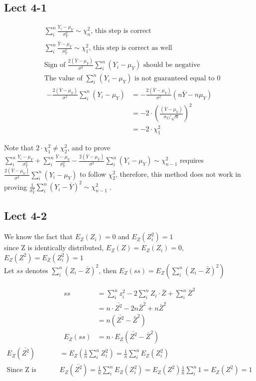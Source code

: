 \documentclass[11pt,letterpaper]{article}
\begin{document}
\subsection*{Lect 4-1}
\begin{align*}
& \sum_i^n \frac{Y_i - \mu_Y}{\sigma_Y^2} \sim \chi_n^2   \text{, this step is correct} \\
& \sum_i^n \frac{\bar{Y} - \mu_Y}{\sigma_Y^2} \sim \chi_1^2  \text{, this step is correct as well} \\
& \text{Sign of }  \frac{2 (\bar{Y} - \mu_Y)}{\sigma^2} \sum_i^n (Y_i - \mu_Y)  \text{ should be negative } \\
& \text{The value of } \sum_i^n (Y_i - \mu_Y)  \text{ is not guaranteed equal to 0}
\end{align*}
\begin{align*}
- \frac{2 (\bar{Y} - \mu_Y)}{\sigma^2} \sum_i^n (Y_i - \mu_Y) &= - \frac{2 (\bar{Y} - \mu_Y)}{\sigma^2} (n \bar{Y} - n \mu_Y) \\
&= -2 \cdot (\frac{(\bar{Y} - \mu_Y)}{\sigma_Y / \sqrt{n}})^2 \\
&= -2 \cdot \chi^2_1
\end{align*}

\noindent Note that $2 \cdot \chi^2_1 \neq \chi^2_2$, and to prove $\sum_i^n \frac{Y_i - \mu_Y}{\sigma_Y^2} + \sum_i^n \frac{\bar{Y} - \mu_Y}{\sigma_Y^2} - \frac{2 (\bar{Y} - \mu_Y)}{\sigma^2} \sum_i^n (Y_i - \mu_Y) \sim \chi^2_{n-1}$ requires $\frac{2 (\bar{Y} - \mu_Y)}{\sigma^2} \sum_i^n (Y_i - \mu_Y)$ to follow $\chi^2_{2}$, therefore, this method does not work in proving $\frac{1}{\sigma^2_Y} \sum_i^n (Y_i - \bar{Y})^2 \sim \chi^2_{n-1}$ .

\subsection*{Lect 4-2}
We know the fact that $E_{Z}(Z_i)=0$ and $E_Z(Z_i^2) = 1$ \\

\noindent since Z is identically distributed, $E_Z(Z) = E_Z(Z_i) = 0$, $E_Z(Z^2) = E_Z(Z_i^2) = 1$\\

Let $ss$ denotes $\sum_i^n (Z_i - \bar{Z})^2$, then $E_Z(ss) = E_Z (\sum_i^n (Z_i - \bar{Z})^2)$

\begin{align*}
ss &= \sum_i^n z_i^2 - 2 \sum_i^n Z_i \cdot \bar{Z} + \sum_i^n \bar{Z} ^2 \\
&= n \cdot \bar{Z^2} - 2 n \bar{Z}^2 + n \bar{Z}^2 \\
&= n ( \bar{Z^2} - \bar{Z}^2 ) \\
E_Z(ss) &= n\cdot E_Z(\bar{Z^2} - \bar{Z}^2)
\end{align*}
\begin{align*}
E_Z(\bar{Z^2}) &= E_Z(\frac{1}{n} \sum_i^n Z_i^2) = \frac{1}{n} \sum_i^n E_Z(Z_i^2) \\
\text{Since Z is identical distributed, }  & E_Z(\bar{Z^2}) = \frac{1}{n} \sum_i^n E_Z(Z_i^2) = E_Z(Z^2) \frac{1}{n} \sum_i^n 1=  E_Z(Z^2) = 1
\end{align*}
\end{document}
